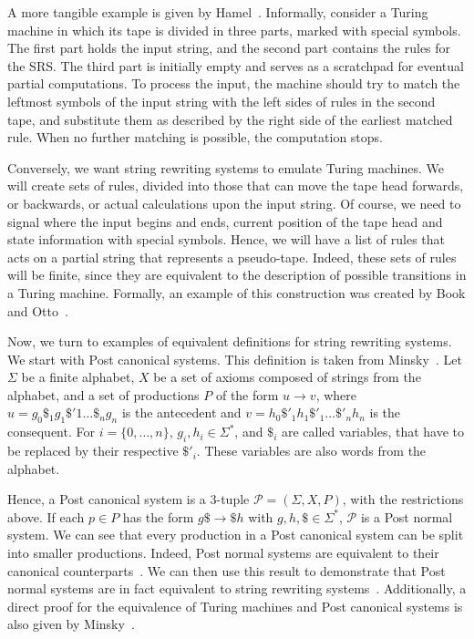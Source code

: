 \documentclass[12pt]{article}
\begin{document}
A more tangible example is given by Hamel~\cite{Hamel:misc:2016:sep}.
Informally, consider a Turing machine in which its tape is divided in three
parts, marked with special symbols. The first part holds the input string, and
the second part contains the rules for the SRS. The third part is initially
empty and serves as a scratchpad for eventual partial computations. To process
the input, the machine should try to match the leftmost symbols of the input
string with the left sides of rules in the second tape, and substitute them as
described by the right side of the earliest matched rule. When no further
matching is possible, the computation stops.

Conversely, we want string rewriting systems to emulate Turing machines. We
will create sets of rules, divided into those that can move the tape head
forwards, or backwards, or actual calculations upon the input string. Of
course, we need to signal where the input begins and ends, current position of
the tape head and state information with special symbols. Hence, we will have a
list of rules that acts on a partial string that represents a pseudo-tape.
Indeed, these sets of rules will be finite, since they are equivalent to the
description of possible transitions in a Turing machine. Formally, an example
of this construction was created by Book and Otto~\cite[Sec.
2.5]{Book:book:1993}.

Now, we turn to examples of equivalent definitions for string rewriting
systems. We start with Post canonical systems. This definition is taken from
Minsky~\cite[Sec. 12.5]{Minsky:book:1967}. Let $\Sigma$ be a finite alphabet,
$X$ be a set of axioms composed of strings from the alphabet, and a set of
productions $P$ of the form $u \rightarrow v$, where $u =
g_{0}\$_{1}g_{1}\$'{1} \dots \$_{n}g_{n}$ is the antecedent and $v =
h_{0}\$'_{1}h_{1}\$'_{1} \dots \$'_{n}h_{n}$ is the consequent. For $i = \{0,
\dots, n\}$, $g_{i}, h_{i} \in \Sigma^{*}$, and $\$_{i}$ are called variables,
that have to be replaced by their respective $\$'_{i}$. These variables are
also words from the alphabet.

Hence, a Post canonical system is a $3$-tuple $\mathcal{P} = (\Sigma, X, P)$,
with the restrictions above. If each $p \in P$ has the form $g\$ \rightarrow
\$h$ with $g, h, \$ \in \Sigma^{*}$, $\mathcal{P}$ is a Post normal system. We
can see that every production in a Post canonical system can be split into
smaller productions. Indeed, Post normal systems are equivalent to their
canonical counterparts~\cite[Theorem 13.1]{Minsky:book:1967}. We can then use
this result to demonstrate that Post normal systems are in fact equivalent to
string rewriting systems~\cite[Sec. 6.5, Theorem 5.1]{Davis:book:1958}.
Additionally, a direct proof for the equivalence of Turing machines and Post
canonical systems is also given by Minsky~\cite[Sec. 12.6]{Minsky:book:1967}.
\end{document}
